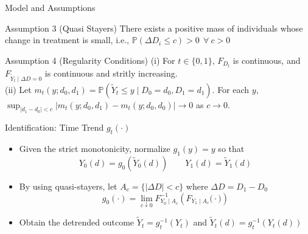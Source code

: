 \documentclass[aspectratio=1610, 9pt]{beamer}
\begin{document}
\begin{frame}{Model and Assumptions}
\begin{block}{Assumption 3 (Quasi Stayers)}
 There exists a positive mass of individuals whose change in treatment is small, i.e., $ \mathbb{P}(\Delta D_i\leq c)>0\ \ \forall \ c >0$ 
\end{block}

\begin{block}{Assumption 4 (Regularity Conditions)}
(i) For $t\in\{0,1\}$, $F_{D_t}$ is continuous, and $F_{\tilde{Y}_{t}\mid \Delta D=0}$ is continuous and stritly increasing.\\ 
(ii) Let $m_{t}(y;d_{0},d_{1})=\mathbb{P}(\tilde{Y}_{t}\leq y\mid D_{0}=d_{0},D_{1}=d_{1})$. For each $y$, $\sup_{\vert d_{1}-d_{0}\vert<c}\vert m_{t}(y;d_{0},d_{1})-m_{t}(y;d_{0},d_{0})\vert\to0$ as $c\to0$.\\


    
\end{block}
    
\end{frame}

\begin{frame}{Identification: Time Trend $g_{t}(\cdot)$}
    \begin{itemize}
        \item Given the strict monotonicity, normalize $g_{1}(y)=y$ so that
           $$Y_{0}(d)=g_{0}(\tilde{Y}_{0}(d))\qquad  Y_{1}(d)=\tilde{Y}_{1}(d)$$
        \item By using quasi-stayers, let $A_c = \{|\Delta D|< c \}$ where $\Delta D=D_1-D_0$  
        $$g_{0}(\cdot)=\lim_{c\downarrow 0 } F_{Y_{0}\mid A_c}^{-1}\left(F_{Y_{1}\mid A_c}\big(\cdot \big)\right)$$ 
        
        \item Obtain the detrended outcome $\tilde{Y}_{t}=g_{t}^{-1}(Y_{t})$ and $\tilde{Y}_{t}(d)=g_{t}^{-1}(Y_{t}(d))$ 
    \end{itemize}

\end{frame}
\end{document}
